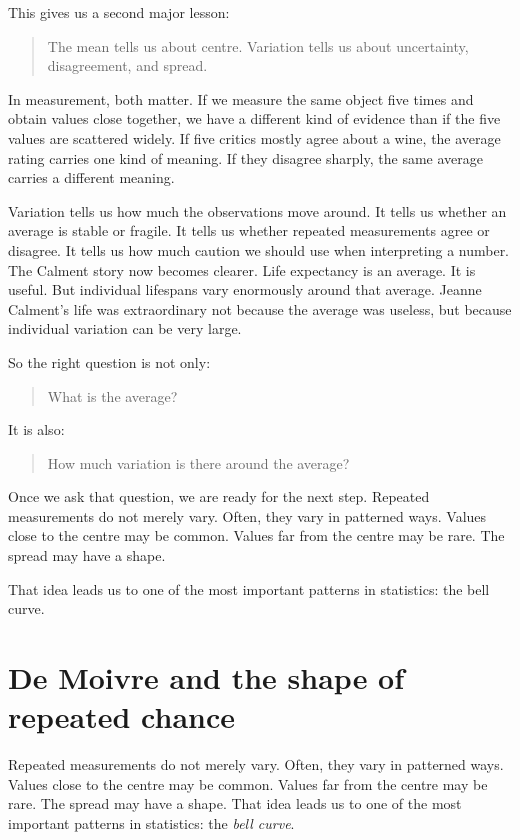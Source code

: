 \documentclass[
  letterpaper,
  DIV=11,
  numbers=noendperiod]{scrreprt}
\begin{document}
This gives us a second major lesson:

\begin{quote}
The mean tells us about centre. Variation tells us about uncertainty,
disagreement, and spread.
\end{quote}

In measurement, both matter. If we measure the same object five times
and obtain values close together, we have a different kind of evidence
than if the five values are scattered widely. If five critics mostly
agree about a wine, the average rating carries one kind of meaning. If
they disagree sharply, the same average carries a different meaning.

Variation tells us how much the observations move around. It tells us
whether an average is stable or fragile. It tells us whether repeated
measurements agree or disagree. It tells us how much caution we should
use when interpreting a number. The Calment story now becomes clearer.
Life expectancy is an average. It is useful. But individual lifespans
vary enormously around that average. Jeanne Calment's life was
extraordinary not because the average was useless, but because
individual variation can be very large.

So the right question is not only:

\begin{quote}
What is the average?
\end{quote}

It is also:

\begin{quote}
How much variation is there around the average?
\end{quote}

Once we ask that question, we are ready for the next step. Repeated
measurements do not merely vary. Often, they vary in patterned ways.
Values close to the centre may be common. Values far from the centre may
be rare. The spread may have a shape.

That idea leads us to one of the most important patterns in statistics:
the bell curve.

\section{De Moivre and the shape of repeated
chance}\label{de-moivre-and-the-shape-of-repeated-chance}

Repeated measurements do not merely vary. Often, they vary in patterned
ways. Values close to the centre may be common. Values far from the
centre may be rare. The spread may have a shape. That idea leads us to
one of the most important patterns in statistics: the \emph{bell curve}.
\end{document}
